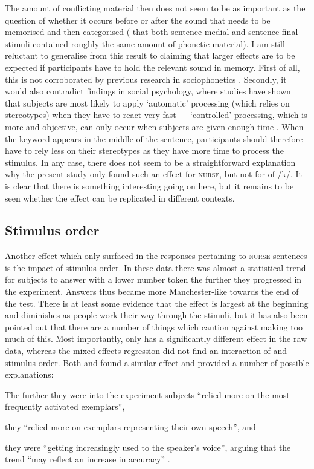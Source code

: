 The amount of conflicting material then does not seem to be as important as the question of whether it occurs before or after the sound that needs to be memorised and then categorised ( that both sentence-medial and sentence-final stimuli contained roughly the same amount of phonetic material).
I am still reluctant to generalise from this result to claiming that larger  effects are to be expected if participants have to hold the relevant sound in memory.
First of all, this is not corroborated by previous research in sociophonetics \parencite{hayetal2006a,haydrager2010}.
Secondly, it would also contradict findings in social psychology, where studies have shown that subjects are most likely to apply `automatic' processing (which relies on stereotypes) when they have to react very fast --- `controlled' processing, which is more  and objective, can only occur when subjects are given enough time \parencite[cf.][33--34]{petersensix2008}.
When the keyword appears in the middle of the sentence, participants should therefore have to rely less on their stereotypes as they have more time to process the stimulus.
In any case, there does not seem to be a straightforward explanation why the present study only found such an effect for \textsc{nurse}, but not for  of /k/.
It is clear that there is something interesting going on here, but it remains to be seen whether the effect can be replicated in different contexts.

		\subsection{Stimulus order}

Another effect which only surfaced in the responses pertaining to \textsc{nurse} sentences is the impact of stimulus order.
In these data there was almost a statistical trend for subjects to answer with a lower number token the further they progressed in the experiment.
Answers thus became more Manchester-like towards the end of the test.
There is at least some evidence that the  effect is largest at the beginning and diminishes as people work their way through the stimuli, but it has also been pointed out that there are a number of things which caution against making too much of this.
Most importantly,  only has a significantly different effect in the raw data, whereas the mixed-effects regression did not find an interaction of  and stimulus order.
Both \textcite{hayetal2006a} and \textcite{haydrager2010} found a similar effect and provided a number of possible explanations:
	\begin{inparaenum}[(1)]
		\item The further they were into the experiment subjects ``relied more on the most frequently activated exemplars'',
		\item they ``relied more on exemplars representing their own speech'', and
		\item they were ``getting increasingly used to the speaker's voice'', arguing that the trend ``may reflect an increase in accuracy'' \parencite[881--882]{haydrager2010}.
	\end{inparaenum}

